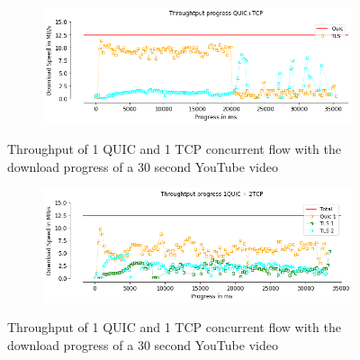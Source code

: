 \begin{frame}
\begin{figure}[!htb]
    \centering
    \begin{subfigure}{0.5\textwidth}
        \includegraphics[width=\linewidth]{./plots/youtube/throughput/ThroughtputprogressQUIC+TCP.png}
    \end{subfigure}
    
    \caption{Throughput of 1 QUIC and 1 TCP concurrent flow with the download progress of a 30 second YouTube video}\label{fig:throughput-of-1}
\end{figure}


\begin{figure}[!htb]
    \centering
    \begin{subfigure}{0.5\textwidth}
        \includegraphics[width=\linewidth]{./plots/youtube/throughput/Throughtputprogress1QUIC+2TCP.png}
    \end{subfigure}
    
    \caption{Throughput of 1 QUIC and 1 TCP concurrent flow with the download progress of a 30 second YouTube video}\label{fig:throughput-of-2}
\end{figure}

\end{frame}
\clearpage

